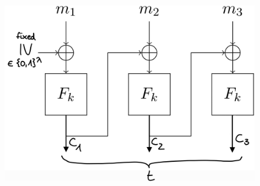 \begin{itemize}
\begin{figure}[h]
    \includegraphics[width=\textwidth,height=\textheight,keepaspectratio]{ModKrypt_7-3b.jpg}
    \centering
\end{figure}


\end{itemize}
